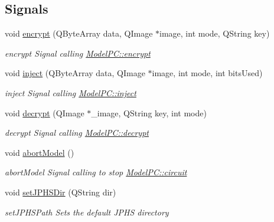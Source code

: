 \subsection*{Signals}
\begin{DoxyCompactItemize}
\item 
void \hyperlink{class_view_p_c_a9d179ff85ed8b1ca0ff7fa495965b52d}{encrypt} (Q\+Byte\+Array data, Q\+Image $\ast$image, int mode, Q\+String key)
\begin{DoxyCompactList}\small\item\em encrypt Signal calling \hyperlink{class_model_p_c_a6f191f62d4635d0d3555fcc0be298794}{Model\+P\+C\+::encrypt} \end{DoxyCompactList}\item 
void \hyperlink{class_view_p_c_a652c98014c2df32178d43a5a9612dd99}{inject} (Q\+Byte\+Array data, Q\+Image $\ast$image, int mode, int bits\+Used)
\begin{DoxyCompactList}\small\item\em inject Signal calling \hyperlink{class_model_p_c_aada6a04d81ada8f2b4ba18108c8d6f10}{Model\+P\+C\+::inject} \end{DoxyCompactList}\item 
void \hyperlink{class_view_p_c_a365df051360d557c7221474ad856e0af}{decrypt} (Q\+Image $\ast$\+\_\+image, Q\+String key, int mode)
\begin{DoxyCompactList}\small\item\em decrypt Signal calling \hyperlink{class_model_p_c_a5995215a34a1e1f504035715a8013809}{Model\+P\+C\+::decrypt} \end{DoxyCompactList}\item 
void \hyperlink{class_view_p_c_aa652102ce6b5757b8eef830409c8cabf}{abort\+Model} ()
\begin{DoxyCompactList}\small\item\em abort\+Model Signal calling to stop \hyperlink{class_model_p_c_a1d0091062a0c836b283ec2f67411623b}{Model\+P\+C\+::circuit} \end{DoxyCompactList}\item 
void \hyperlink{class_view_p_c_ae81085836c0c01bc9556a5b27eb8d19c}{set\+J\+P\+H\+S\+Dir} (Q\+String dir)
\begin{DoxyCompactList}\small\item\em set\+J\+P\+H\+S\+Path Sets the default J\+P\+HS directory \end{DoxyCompactList}\end{DoxyCompactItemize}
